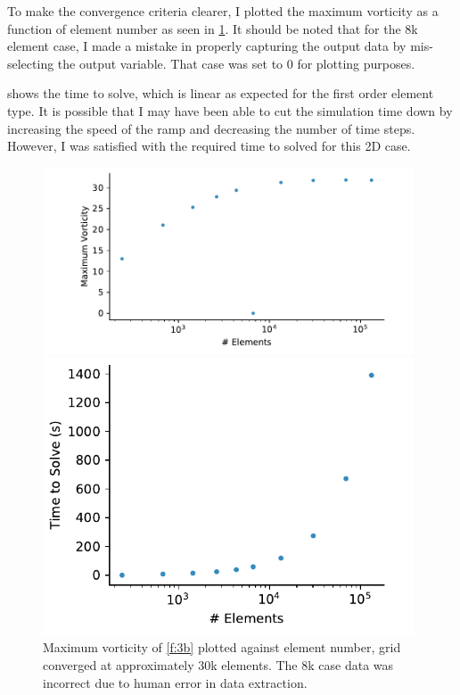 \documentclass[10pt,english]{article}
\begin{document}
To make the convergence criteria clearer, I plotted the maximum vorticity as a function of element number as seen in \cref{f:3b_max}.  It should be noted that for the 8k element case, I made a mistake in properly capturing the output data by mis-selecting the output variable.  That case was set to 0 for plotting purposes.

 shows the time to solve, which is linear as expected for the first order element type.  It is possible that I may have been able to cut the simulation time down by increasing the speed of the ramp and decreasing the number of time steps.  However, I was satisfied with the required time to solved for this 2D case.  \\

\vspace{10pt}
\begin{figure}[h]
\centering
\begin{minipage}{.58\textwidth}
  \centering
\includegraphics[trim={1.2cm 0cm .0cm 0cm},clip,width=0.98\textwidth]{fig3b_max}
  \caption{Maximum vorticity of \cref{f:3b} plotted against element number, grid converged at approximately 30k elements.  The 8k case data was incorrect due to human error in data extraction.}
\label{f:3b_max}
\end{minipage}%
\hspace{5pt}
\begin{minipage}{.38\textwidth}
  \centering
  \vspace{20pt}
\includegraphics[trim={.1cm 0cm .5cm .2cm},clip,width=0.98\textwidth]{fig3b_time_cells}

\end{minipage}
\end{figure}
\end{document}
